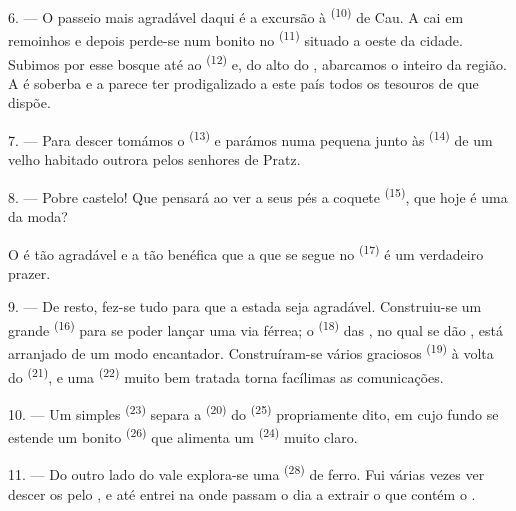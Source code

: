 \VUsaut{3.0mm}
\VUsaut{3.0mm}

6. --- O passeio mais agradável daqui é a excursão à 
\textsuperscript{(10)} de Cau. A  cai em remoinhos e
depois perde-se num bonito  no 
\textsuperscript{(11)} situado a oeste da cidade. Subimos por esse bosque até ao
 \textsuperscript{(12)} e, do alto do
, abarcamos o  inteiro da região. A
 é soberba e a  parece ter prodigalizado
a este país todos os tesouros de que dispõe.

7. --- Para descer tomámos o  \textsuperscript{(13)} e parámos
numa pequena  junto às  \textsuperscript{(14)} de um
velho  habitado outrora pelos senhores de Pratz.

8. --- Pobre castelo! Que pensará ao ver a seus pés a coquete
 \textsuperscript{(15)}, que hoje é uma  da moda?

O  é tão agradável e a  tão benéfica que
a  que se segue no  \textsuperscript{(17)} é um
verdadeiro prazer.

\VUsaut{3.0mm}
\VUsaut{3.0mm}

9. --- De resto, fez-se tudo para que a estada seja agradável.
Construiu-se um grande  \textsuperscript{(16)} para se poder
lançar uma via férrea; o  \textsuperscript{(18)} das
, no qual se dão , está arranjado de um
modo encantador. Construíram-se vários graciosos 
\textsuperscript{(19)} à volta do  \textsuperscript{(21)}, e uma
 \textsuperscript{(22)} muito bem tratada torna facílimas as
comunicações.

10. --- Um simples  \textsuperscript{(23)} separa a 
\textsuperscript{(20)} do  \textsuperscript{(25)} propriamente dito, em cujo
fundo se estende um bonito  \textsuperscript{(26)} que alimenta um
 \textsuperscript{(24)} muito claro.

11. --- Do outro lado do vale explora-se uma  \textsuperscript{(28)}
de ferro. Fui várias vezes ver descer os  pelo
, e até entrei na  onde passam o dia a
extrair o  que contém o .


